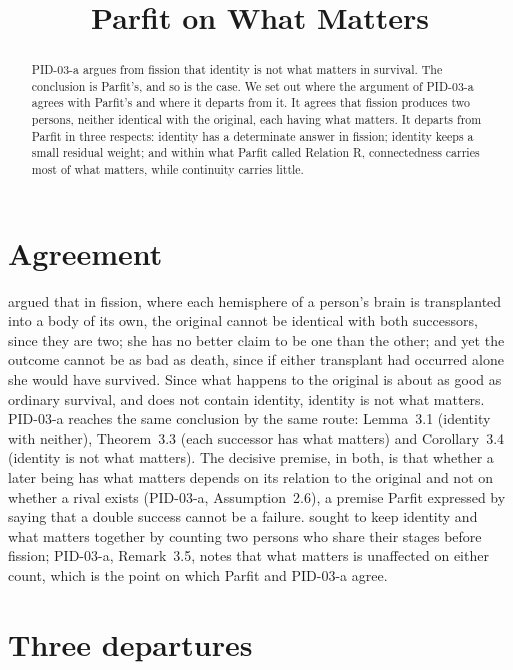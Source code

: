 \documentclass{situationist-preprint}
\title{Parfit on What Matters}
\begin{document}
\maketitle

\begin{abstract}
PID-03-a argues from fission that identity is not what matters in survival. The conclusion is Parfit's, and so is the case. We set out where the argument of PID-03-a agrees with Parfit's and where it departs from it. It agrees that fission produces two persons, neither identical with the original, each having what matters. It departs from Parfit in three respects: identity has a determinate answer in fission; identity keeps a small residual weight; and within what Parfit called Relation R, connectedness carries most of what matters, while continuity carries little.
\end{abstract}

\section{Agreement}

\citet[ch.~12]{Parfit1984} argued that in fission, where each hemisphere of a person's brain is transplanted into a body of its own, the original cannot be identical with both successors, since they are two; she has no better claim to be one than the other; and yet the outcome cannot be as bad as death, since if either transplant had occurred alone she would have survived. Since what happens to the original is about as good as ordinary survival, and does not contain identity, identity is not what matters. PID-03-a reaches the same conclusion by the same route: Lemma~3.1 (identity with neither), Theorem~3.3 (each successor has what matters) and Corollary~3.4 (identity is not what matters). The decisive premise, in both, is that whether a later being has what matters depends on its relation to the original and not on whether a rival exists (PID-03-a, Assumption~2.6), a premise Parfit expressed by saying that a double success cannot be a failure. \citet{Lewis1976} sought to keep identity and what matters together by counting two persons who share their stages before fission; PID-03-a, Remark~3.5, notes that what matters is unaffected on either count, which is the point on which Parfit and PID-03-a agree.

\section{Three departures}
\end{document}
